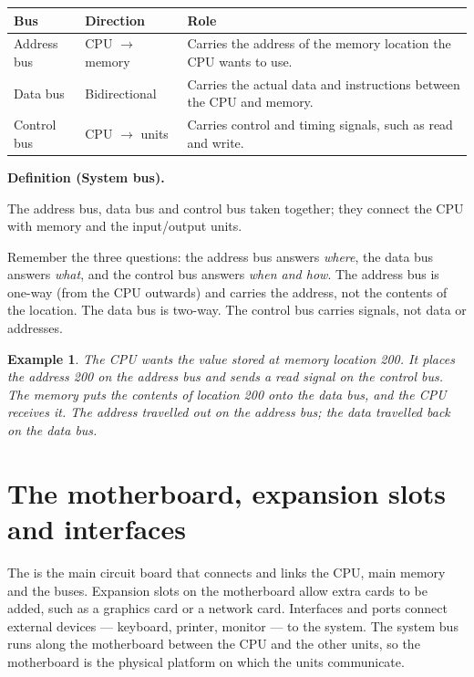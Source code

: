 \documentclass[11pt]{article}
\newtheorem{example}{Example}[section]
\newenvironment{definitionbox}[1]{%
  \par\noindent\textbf{Definition (#1).}\ \itshape
}{\par\vspace{0.3em}}
\begin{document}
\begin{center}
\begin{tabular}{p{}p{}p{}}
\toprule
\textbf{Bus} & \textbf{Direction} & \textbf{Role}\\
\midrule
Address bus & CPU $\rightarrow$ memory & Carries the address of the memory
location the CPU wants to use.\\
Data bus & Bidirectional & Carries the actual data and instructions between
the CPU and memory.\\
Control bus & CPU $\rightarrow$ units & Carries control and timing signals,
such as read and write.\\
\bottomrule
\end{tabular}
\end{center}

\begin{definitionbox}{System bus}
The address bus, data bus and control bus taken together; they connect the
CPU with memory and the input/output units.
\end{definitionbox}

Remember the three questions: the address bus answers \emph{where}, the data
bus answers \emph{what}, and the control bus answers \emph{when and how}. The
address bus is one-way (from the CPU outwards) and carries the address, not
the contents of the location. The data bus is two-way. The control bus
carries signals, not data or addresses.

\begin{example}
The CPU wants the value stored at memory location 200. It places the address
200 on the address bus and sends a read signal on the control bus. The memory
puts the contents of location 200 onto the data bus, and the CPU receives it.
The address travelled out on the address bus; the data travelled back on the
data bus.
\end{example}

\section{The motherboard, expansion slots and interfaces}
The  is the main circuit board that connects and links the
CPU, main memory and the buses. Expansion slots on the motherboard allow
extra cards to be added, such as a graphics card or a network card. Interfaces
and ports connect external devices --- keyboard, printer, monitor --- to the
system. The system bus runs along the motherboard between the CPU and the
other units, so the motherboard is the physical platform on which the units
communicate.
\end{document}
